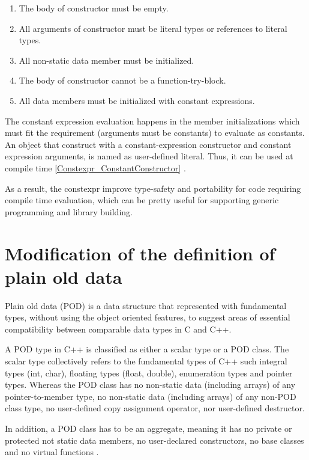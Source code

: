 \documentclass[11pt]{report}
\begin{document}
\begin{enumerate}
\item	The body of constructor must be empty.
\item	All arguments of constructor must be literal types or references to literal types.
\item   All non-static data member must be initialized.
\item	The body of constructor cannot be a function-try-block.
\item	All data members must be initialized with constant expressions.
\end{enumerate}

The constant expression evaluation happens in the member initializations which must fit the requirement (arguments must be constants) to evaluate as constants. An object that construct with a constant-expression constructor and constant expression arguments, is named as user-defined literal. Thus, it can be used at compile time \ref{Constexpr_ConstantConstructor} \cite{Gregorie:professionalcpp}.
\newline

As a result, the constexpr improve type-safety and portability for code requiring compile time evaluation, which can be pretty useful for supporting generic programming and library building.

\section{Modification of the definition of plain old data}
\label{section: Modification of the definition of plain old data}
Plain old data (POD) is a data structure that represented with fundamental types, without using the object oriented features, to suggest areas of essential compatibility between comparable data types in C and C++.
\newline

A POD type in C++ is classified as either a scalar type or a POD class. The scalar type collectively refers to the fundamental types of C++ such integral types (int, char), floating types (float, double), enumeration types and pointer types. Whereas the POD class has no non-static data (including arrays) of any pointer-to-member type, no non-static data (including arrays) of any non-POD class type, no user-defined copy assignment operator, nor user-defined destructor.
\newline

In addition, a POD class has to be an aggregate, meaning it has no private or protected not static data members, no user-declared constructors, no base classes and no virtual functions \cite{Kalev:1999:ACP}.
\newline
\end{document}
